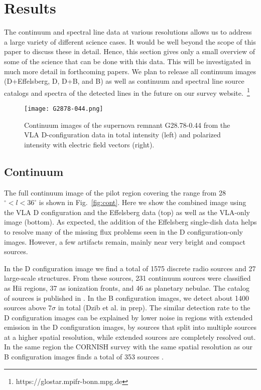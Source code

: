 \documentclass{aa}
\begin{document}
\section{Results}
The continuum and spectral line data at various resolutions allows us to address a large variety of different science cases. It would be well beyond the scope of this paper to discuss these in detail. Hence, this section gives only a small overview of some of the science that can be done with this data. This will be investigated in much more detail in forthcoming papers. We plan to release all continuum images (D+Effelsberg, D, D+B, and B) as well as continuum and spectral line source catalogs and spectra of the detected lines in the future on our survey website.~\footnote{https://glostar.mpifr-bonn.mpg.de}

\begin{figure*}
\texttt{[image: G2878-044.png]}
\caption{Continuum images of the supernova remnant G28.78-0.44 from the VLA D-configuration data in total intensity (left) and polarized intensity with electric field vectors (right).}
\label{fig:G28.78}
\end{figure*}

\subsection{Continuum}
The full continuum image of the pilot region covering the range from 28$^\circ<l<36^\circ$ is shown in Fig.~\ref{fig:cont}. Here we show the combined image using the VLA D configuration and the Effelsberg data (top) as well as the  VLA-only image (bottom). As expected, the addition of the Effelsberg single-dish data helps to resolve many of the missing flux problems seen in the D configuration-only images. However, a few artifacts remain, mainly near very bright and compact sources.





In the D configuration image we find a total of 1575 discrete radio sources and 27 large-scale structures. From these sources, 231 continuum sources were classified as H{\sc ii} regions, 37 as ionization fronts, and 46 as planetary nebulae. The catalog of sources is published in \cite{Medina2019}. In the B configuration images, we detect about 1400 sources above 7$\sigma$ in total (Dzib et al. in prep). The similar detection rate to the D configuration images can be explained by  lower noise in regions with extended emission in the D configuration images, by sources that split into multiple sources at a higher spatial resolution, while extended sources are completely resolved out. In the same region the CORNISH survey with the same spatial resolution as our B configuration images finds a total of 353 sources \citep{PurcellHoareCotton2013}.
\end{document}
